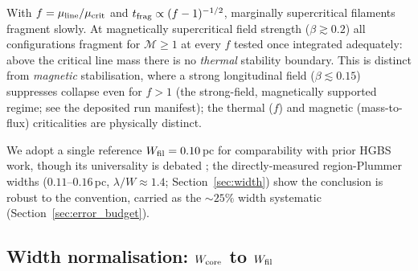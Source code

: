 \documentclass[usenatbib,twoside,twocolumn]{mnras}
\begin{document}
With $f=\mu_{\rm line}/\mu_{\rm crit}$ and $t_{\rm frag}\propto(f-1)^{-1/2}$, marginally supercritical filaments fragment slowly. At magnetically supercritical field strength ($\beta\gtrsim0.2$) all configurations fragment for $\mathcal{M}\geq1$ at every $f$ tested once integrated adequately: above the critical line mass there is no \emph{thermal} stability boundary. This is distinct from \emph{magnetic} stabilisation, where a strong longitudinal field ($\beta\lesssim0.15$) suppresses collapse even for $f>1$ (the strong-field, magnetically supported regime; see the deposited run manifest); the thermal ($f$) and magnetic (mass-to-flux) criticalities are physically distinct.

We adopt a single reference $W_{\rm fil}=0.10$\,pc for comparability with prior HGBS work, though its universality is debated \citep{Panopoulou2017,Panopoulou2022}; the directly-measured region-Plummer widths ($0.11$--$0.16$\,pc, $\lambda/W\approx1.4$; Section~\ref{sec:width}) show the conclusion is robust to the convention, carried as the $\sim25\%$ width systematic (Section~\ref{sec:error_budget}).

\subsection{Width normalisation: $W_{\rm core}$ to $W_{\rm fil}$}
\label{sec:width_correction}
\end{document}
